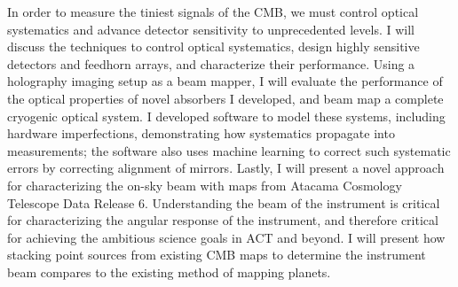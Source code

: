 \documentclass{ucetd}
\begin{document}
In order to measure the tiniest signals of the CMB, we must control optical systematics and advance detector sensitivity to unprecedented levels. I will discuss the techniques to control optical systematics, design highly sensitive detectors and feedhorn arrays, and characterize their performance. Using a holography imaging setup as a beam mapper, I will evaluate the performance of the optical properties of novel absorbers I developed, and beam map a complete cryogenic optical system. I developed software to model these systems,  including hardware imperfections, demonstrating how systematics propagate into measurements; the software also uses machine learning to correct such systematic errors by correcting alignment of mirrors.  Lastly, I will present a novel approach for characterizing the on-sky beam with maps from Atacama Cosmology Telescope Data Release 6.  Understanding the beam of the instrument is critical for characterizing the angular response of the instrument, and therefore critical for achieving the ambitious science goals in ACT and beyond.  I will present how stacking point sources from existing CMB maps to determine the instrument beam compares to the existing method of mapping planets.

\mainmatter











\appendix


% 




\acknowledgments

    
\end{document}
